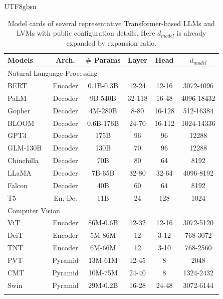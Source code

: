 \documentclass[10pt,journal,compsoc]{IEEEtran}
\newcommand{\<}{\left\langle}
\renewcommand{\>}{\right\rangle}
\newcommand{\1}{\mathbbm{1}}
\begin{document}
\begin{CJK}{UTF8}{gbsn}
\begin{table}[t]
	\centering
	\footnotesize
	\renewcommand\arraystretch{1.0}
	\setlength{\tabcolsep}{3.8pt}
	\caption{\small{Model cards of several representative Transformer-based LLMs and LVMs with public configuration details. Here $d_{model}$ is already expanded by expansion ratio.}}
	\vspace{-0.5em}
	\begin{tabular}{l|c|c|c|c|c}
		\Xhline{1pt}
		Models & Arch. & $\#$ Params & Layer & Head & $d_{model}$ \\
		\hline
		\multicolumn{6}{l}{Natural Language Processing} \\
		\hline
		BERT~\cite{devlin2018bert} & Encoder & 0.1B-0.3B & 12-24 & 12-16 & 3072-4096 \\
		PaLM~\cite{chowdhery2022palm} & Decoder & 9B-540B & 32-118 & 16-48 & 4096-18432 \\
		Gopher~\cite{rae2021scaling} & Decoder & 4M-280B & 8-80 & 16-128 & 512-16384 \\
		BLOOM~\cite{scao2022bloom} & Decoder & 0.6B-176B & 24-70 & 16-112 & 1024-14336 \\
		GPT3~\cite{brown2020language} & Decoder & 175B & 96 & 96 & 12288 \\
		GLM-130B~\cite{zeng2022glm} & Decoder & 130B & 70 & 96 & 12288 \\
		Chinchilla~\cite{hoffmann2022training} & Decoder & 70B & 80 & 64 & 8192 \\
		LLaMA~\cite{touvron2023llama} & Decoder & 7B-65B & 32-80 & 32-64 & 4096-8192 \\
		Falcon~\cite{penedo2023refinedweb} & Decoder & 40B & 60 & 64 & 8192 \\
		T5~\cite{raffel2020exploring} & En.-De. & 11B & 24 & 128 & 1024 \\
		\hline
		\multicolumn{6}{l}{Computer Vision} \\
		\hline
		ViT~\cite{dosovitskiy2020image} & Encoder & 86M-0.6B & 12-32 & 12-16 & 3072-5120 \\
		DeiT~\cite{touvron2021training} & Encoder & 5M-86M & 12 & 3-12 & 768-3072 \\
		TNT~\cite{han2021Transformer} & Encoder &6M-66M & 12 & 3-10 & 768-2560 \\
		PVT~\cite{wang2021pyramid} & Pyramid & 13M-61M & 12-45 & 8 & 2048 \\
		CMT~\cite{guo2022cmt} & Pyramid &10M-75M & 24-40 & 8 & 1324-2432 \\
		Swin~\cite{liu2021swin} & Pyramid & 29M-0.2B & 16-28 & 24-48 & 3072-6144 \\
		\Xhline{1pt}
	\end{tabular}
	\label{table:efficient_arch}
\end{table}


\end{CJK}
\end{document}
